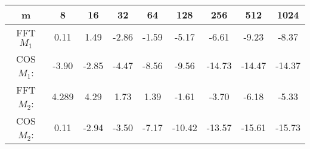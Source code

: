 \begin{minipage}{\textwidth}
\begin{center}
\begin{framed}
\begin{tabular}{c|c|c|c|c|c|c|c|c}
m & 8 & 16 & 32 & 64 & 128 & 256 & 512 & 1024 \\
\hline
FFT \(M_1\) & 0.11 &  1.49 & -2.86 & -1.59 & -5.17 & -6.61 &  -9.23 & -8.37 \\
COS \(M_1\): & -3.90&  -2.85 &  -4.47 &  -8.56 &  -9.56& -14.73 & -14.47 & -14.37\\
FFT \(M_2\):&4.289 &  4.29 & 1.73&  1.39 & -1.61 & -3.70 & -6.18& -5.33\\
COS \(M_2\): &0.11 &  -2.94 & -3.50 &  -7.17 & -10.42 & -13.57 & -15.61& -15.73\\
\end{tabular} 
 \label{table2}
\end{framed}
\end{center}
\end{minipage}